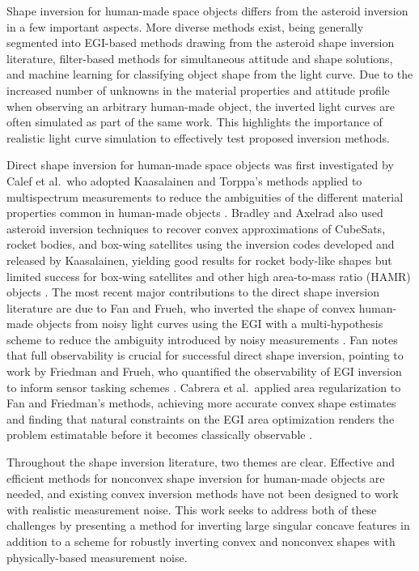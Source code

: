 Shape inversion for human-made space objects differs from the asteroid inversion in a few important aspects. More diverse methods exist, being generally segmented into EGI-based methods drawing from the asteroid shape inversion literature, filter-based methods for simultaneous attitude and shape solutions, and machine learning for classifying object shape from the light curve. Due to the increased number of unknowns in the material properties and attitude profile when observing an arbitrary human-made object, the inverted light curves are often simulated as part of the same work. This highlights the importance of realistic light curve simulation to effectively test proposed inversion methods. 

Direct shape inversion for human-made space objects was first investigated by Calef et al.\, who adopted Kaasalainen and Torppa's methods applied to multispectrum measurements to reduce the ambiguities of the different material properties common in human-made objects \cite{calef2006photometric}. Bradley and Axelrad also used asteroid inversion techniques to recover convex approximations of CubeSats, rocket bodies, and box-wing satellites using the inversion codes developed and released by Kaasalainen, yielding good results for rocket body-like shapes but limited success for box-wing satellites and other high area-to-mass ratio (HAMR) objects \cite{bradley2014}. The most recent major contributions to the direct shape inversion literature are due to Fan and Frueh, who inverted the shape of convex human-made objects from noisy light curves using the EGI with a multi-hypothesis scheme to reduce the ambiguity introduced by noisy measurements \cite{fan2019, fan2020thesis, fan2021}. Fan notes that full observability is crucial for successful direct shape inversion, pointing to work by Friedman and Frueh, who quantified the observability of EGI inversion to inform sensor tasking schemes \cite{friedman2020, friedman2022}. Cabrera et al.\ applied area regularization to Fan and Friedman's methods, achieving more accurate convex shape estimates and finding that natural constraints on the EGI area optimization renders the problem estimatable before it becomes classically observable \cite{cabrera2021}. 

Throughout the shape inversion literature, two themes are clear. Effective and efficient methods for nonconvex shape inversion for human-made objects are needed, and existing convex inversion methods have not been designed to work with realistic measurement noise. This work seeks to address both of these challenges by presenting a method for inverting large singular concave features in addition to a scheme for robustly inverting convex and nonconvex shapes with physically-based measurement noise.

